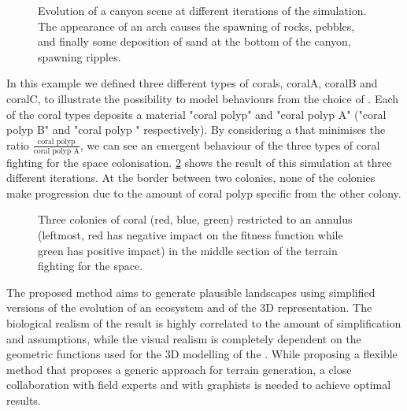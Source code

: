 \begin{figure}
\caption{Evolution of a canyon scene at different iterations of the simulation. The appearance of an arch causes the spawning of rocks, pebbles, and finally some deposition of sand at the bottom of the canyon, spawning ripples.}
\label{fig:env-obj-canyon-scene}
\end{figure}

In this example we defined three different types of corals, coralA, coralB and coralC, to illustrate the possibility to model behaviours from the choice of . Each of the coral types deposits a material "coral polyp" and "coral polyp A" ("coral polyp B" and "coral polyp \curve" respectively). By considering a  that minimises the ratio $\frac{\text{coral polyp}}{\text{coral polyp A}}$, we can see an emergent behaviour of the three types of coral fighting for the space colonisation.
\cref{fig:env-obj-coral-colonization-scene} shows the result of this simulation at three different iterations. At the border between two colonies, none of the colonies make progression due to the amount of coral polyp specific from the other colony.

\begin{figure}
{}
\caption{Three colonies of coral (red, blue, green) restricted to an annulus (leftmost, red has negative impact on the fitness function while green has positive impact) in the middle section of the terrain fighting for the space.}
\label{fig:env-obj-coral-colonization-scene}
\end{figure}

The proposed method aims to generate plausible landscapes using simplified versions of the evolution of an ecosystem and of the 3D representation. The biological realism of the result is highly correlated to the amount of simplification and assumptions, while the visual realism is completely dependent on the geometric functions used for the 3D modelling of the . While proposing a flexible method that proposes a generic approach for terrain generation, a close collaboration with field experts and with graphists is needed to achieve optimal results.


